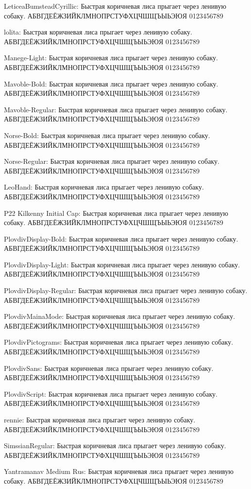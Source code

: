\documentclass[12pt]{article}
\begin{document}
{ LeticeaBumsteadCyrillic: Быстрая коричневая лиса прыгает через ленивую собаку. АБВГДЕЁЖЗИЙКЛМНОПРСТУФХЦЧШЩЪЫЬЭЮЯ 0123456789}

{\lolita lolita: Быстрая коричневая лиса прыгает через ленивую собаку. АБВГДЕЁЖЗИЙКЛМНОПРСТУФХЦЧШЩЪЫЬЭЮЯ 0123456789}

{\manegelight Manege-Light: Быстрая коричневая лиса прыгает через ленивую собаку. АБВГДЕЁЖЗИЙКЛМНОПРСТУФХЦЧШЩЪЫЬЭЮЯ 0123456789}

{\mavoblebold Mavoble-Bold: Быстрая коричневая лиса прыгает через ленивую собаку. АБВГДЕЁЖЗИЙКЛМНОПРСТУФХЦЧШЩЪЫЬЭЮЯ 0123456789}

{\mavobleregular Mavoble-Regular: Быстрая коричневая лиса прыгает через ленивую собаку. АБВГДЕЁЖЗИЙКЛМНОПРСТУФХЦЧШЩЪЫЬЭЮЯ 0123456789}

{\norsebold Norse-Bold: Быстрая коричневая лиса прыгает через ленивую собаку. АБВГДЕЁЖЗИЙКЛМНОПРСТУФХЦЧШЩЪЫЬЭЮЯ 0123456789}

{\norseregular Norse-Regular: Быстрая коричневая лиса прыгает через ленивую собаку. АБВГДЕЁЖЗИЙКЛМНОПРСТУФХЦЧШЩЪЫЬЭЮЯ 0123456789}

{\leohand LeoHand: Быстрая коричневая лиса прыгает через ленивую собаку. АБВГДЕЁЖЗИЙКЛМНОПРСТУФХЦЧШЩЪЫЬЭЮЯ 0123456789}

{\kilkennyinitial P22 Kilkenny Initial Cap: Быстрая коричневая лиса прыгает через ленивую собаку. АБВГДЕЁЖЗИЙКЛМНОПРСТУФХЦЧШЩЪЫЬЭЮЯ 0123456789}

{\plovdivdisplaybold PlovdivDisplay-Bold: Быстрая коричневая лиса прыгает через ленивую собаку. АБВГДЕЁЖЗИЙКЛМНОПРСТУФХЦЧШЩЪЫЬЭЮЯ 0123456789}

{\plovdivdisplaylight PlovdivDisplay-Light: Быстрая коричневая лиса прыгает через ленивую собаку. АБВГДЕЁЖЗИЙКЛМНОПРСТУФХЦЧШЩЪЫЬЭЮЯ 0123456789}

{\plovdivdisplayregular PlovdivDisplay-Regular: Быстрая коричневая лиса прыгает через ленивую собаку. АБВГДЕЁЖЗИЙКЛМНОПРСТУФХЦЧШЩЪЫЬЭЮЯ 0123456789}

{\plovdivmainamode PlovdivMainaMode: Быстрая коричневая лиса прыгает через ленивую собаку. АБВГДЕЁЖЗИЙКЛМНОПРСТУФХЦЧШЩЪЫЬЭЮЯ 0123456789}

{\plovdivpictograms PlovdivPictograms: Быстрая коричневая лиса прыгает через ленивую собаку. АБВГДЕЁЖЗИЙКЛМНОПРСТУФХЦЧШЩЪЫЬЭЮЯ 0123456789}

{\plovdivsans PlovdivSans: Быстрая коричневая лиса прыгает через ленивую собаку. АБВГДЕЁЖЗИЙКЛМНОПРСТУФХЦЧШЩЪЫЬЭЮЯ 0123456789}

{\plovdivscript PlovdivScript: Быстрая коричневая лиса прыгает через ленивую собаку. АБВГДЕЁЖЗИЙКЛМНОПРСТУФХЦЧШЩЪЫЬЭЮЯ 0123456789}

{\rennie rennie: Быстрая коричневая лиса прыгает через ленивую собаку. АБВГДЕЁЖЗИЙКЛМНОПРСТУФХЦЧШЩЪЫЬЭЮЯ 0123456789}

{\simssian SimssianRegular: Быстрая коричневая лиса прыгает через ленивую собаку. АБВГДЕЁЖЗИЙКЛМНОПРСТУФХЦЧШЩЪЫЬЭЮЯ 0123456789}

{\yantramanav Yantramanav Medium Rus: Быстрая коричневая лиса прыгает через ленивую собаку. АБВГДЕЁЖЗИЙКЛМНОПРСТУФХЦЧШЩЪЫЬЭЮЯ 0123456789}
\end{document}
